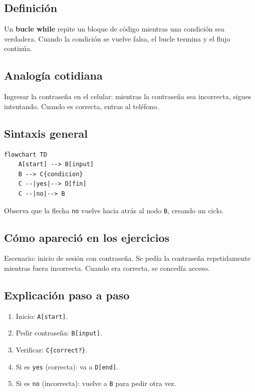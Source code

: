 \documentclass[12pt]{article}
\begin{document}
\subsection{Definición}

Un \textbf{bucle while} repite un bloque de código mientras una condición sea verdadera. Cuando la condición se vuelve falsa, el bucle termina y el flujo continúa.

\subsection{Analogía cotidiana}

Ingresar la contraseña en el celular: mientras la contraseña sea incorrecta, sigues intentando. Cuando es correcta, entras al teléfono.

\subsection{Sintaxis general}

\begin{lstlisting}[style=mermaidstyle]
flowchart TD
    A[start] --> B[input]
    B --> C{condicion}
    C --|yes|--> D[fin]
    C --|no|--> B
\end{lstlisting}

Observa que la flecha \texttt{no} vuelve hacia atrás al nodo \texttt{B}, creando un ciclo.

\subsection{Cómo apareció en los ejercicios}

Escenario: inicio de sesión con contraseña. Se pedía la contraseña repetidamente mientras fuera incorrecta. Cuando era correcta, se concedía acceso.

\subsection{Explicación paso a paso}

\begin{enumerate}
    \item Inicio: \texttt{A[start]}.
    \item Pedir contraseña: \texttt{B[input]}.
    \item Verificar: \texttt{C\{correct?\}}.
    \item Si es \texttt{yes} (correcta): va a \texttt{D[end]}.
    \item Si es \texttt{no} (incorrecta): vuelve a \texttt{B} para pedir otra vez.
\end{enumerate}
\end{document}
